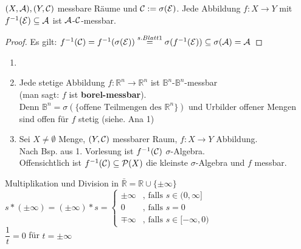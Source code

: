 \documentclass[11pt,a4paper,fleqn,openany]{report}
\begin{document}
    \begin{lemma}
      $(X, \mathcal{A}), (Y, \mathcal{C})$ messbare Räume und $\mathcal{C} := \sigma(\mathcal{E})$. Jede Abbildung $f: X \to Y$ mit $f^{-1}(\mathcal{E}) \subseteq \mathcal{A}$ ist $\mathcal{A}$-$\mathcal{C}$-messbar.
    \end{lemma}

    \begin{proof}
      Es gilt: $f^{-1}(\mathcal{C}) = f^{-1}(\sigma(\mathcal{E})) \stackrel{s. Blatt 1}{=} \sigma(f^{-1}(\mathcal{E})) \subseteq \sigma(\mathcal{A}) = \mathcal{A}$
    \end{proof}

    \begin{example}
      \begin{enumerate}
        \item[]
        \item Jede stetige Abbildung $f: \mathbb{R}^n \to \mathbb{R}^n$ ist $\mathbb{B}^n$-$\mathbb{B}^n$-messbar\\
              (man sagt: $f$ ist \textbf{borel-messbar}).\\
              Denn $\mathbb{B}^n = \sigma(\{\text{offene Teilmengen des } \mathbb{R}^n\})$ und Urbilder offener Mengen sind offen für $f$ stetig (siehe. Ana 1)
        \item Sei $X \neq \emptyset$ Menge, $(Y, \mathcal{C})$ messbarer Raum, $f: X \to Y$ Abbildung.\\
              Nach Bsp. aus 1. Vorlesung ist $f^{-1}(\mathcal{C})$ $\sigma$-Algebra.\\
              Offensichtlich ist $f^{-1}(\mathcal{C}) \subseteq \mathcal{P}(X)$ die kleinste $\sigma$-Algebra und $f$ messbar.
      \end{enumerate}
    \end{example}

    \begin{notation}
      Multiplikation und Division in $\bar{\mathbb{R}} = \mathbb{R} \cup \{\pm \infty\}$\\
      $s * (\pm \infty) = (\pm \infty) * s = \begin{cases}\pm \infty & \text{, falls } s \in (0, \infty] \\ 0 & \text{, falls } s = 0 \\ \mp \infty & \text{, falls } s \in [-\infty, 0)\end{cases}$\\
      $\dfrac{1}{t} = 0$ für $t = \pm \infty$
    \end{notation}
\end{document}
